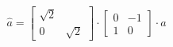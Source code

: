 \documentclass[preview]{standalone}
\begin{document}
\begin{align*}
\hat{a} = \begin{bmatrix} \sqrt{2} &  \\ 0 & \sqrt{2}\end{bmatrix} \cdot \begin{bmatrix} 0 & -1 \\ 1 & 0\end{bmatrix} \cdot a
\end{align*}
\end{document}
